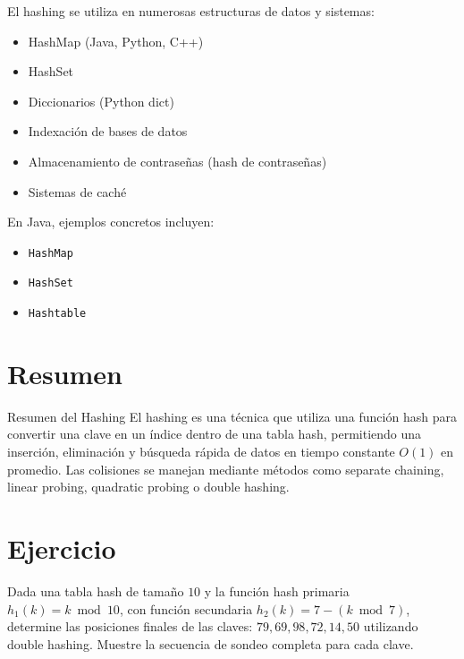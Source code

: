 El hashing se utiliza en numerosas estructuras de datos y sistemas:
\begin{itemize}
    \item HashMap (Java, Python, C++)
    \item HashSet
    \item Diccionarios (Python dict)
    \item Indexación de bases de datos
    \item Almacenamiento de contraseñas (hash de contraseñas)
    \item Sistemas de caché
\end{itemize}

En Java, ejemplos concretos incluyen:
\begin{itemize}
    \item \texttt{HashMap}
    \item \texttt{HashSet}
    \item \texttt{Hashtable}
\end{itemize}

\section{Resumen}
\label{sec:resumen}

\begin{definicion}{Resumen del Hashing}
El hashing es una técnica que utiliza una función hash para convertir una clave en un índice dentro de una tabla hash, permitiendo una inserción, eliminación y búsqueda rápida de datos en tiempo constante \(O(1)\) en promedio. Las colisiones se manejan mediante métodos como separate chaining, linear probing, quadratic probing o double hashing.
\end{definicion}

\section{Ejercicio}
\label{sec:ejercicio}

\begin{ejercicio}
Dada una tabla hash de tamaño \(10\) y la función hash primaria \(h_1(k) = k \bmod 10\), con función secundaria \(h_2(k) = 7 - (k \bmod 7)\), determine las posiciones finales de las claves: \(79, 69, 98, 72, 14, 50\) utilizando double hashing. Muestre la secuencia de sondeo completa para cada clave.
\end{ejercicio}


\printbibliography[heading=subbibliography]